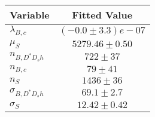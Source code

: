 \begin{tabular}[t]{lc}
\hline
Variable &Fitted Value\\
\hline\hline
$\lambda_{B,c}$&$(-0.0\pm3.3)e-07$\\
\hline
$\mu_S$&$5279.46\pm0.50$\\
\hline
$n_{B, D^* D_s h}$&$722\pm37$\\
\hline
$n_{B,c}$&$79\pm41$\\
\hline
$n_S$&$1436\pm36$\\
\hline
$\sigma_{B, D^* D_s h}$&$69.1\pm2.7$\\
\hline
$\sigma_S$&$12.42\pm0.42$\\
\hline
\end{tabular}